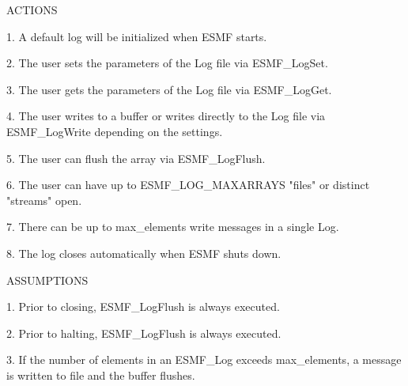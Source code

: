 





ACTIONS



1. A default log will be initialized when ESMF starts.

2. The user sets the parameters of the Log file via ESMF_LogSet.

3. The user gets the parameters of the Log file via ESMF_LogGet.

4. The user writes to a buffer or writes directly to the Log file via ESMF_LogWrite depending on the settings.

5. The user can flush the array via ESMF_LogFlush.

6. The user can have up to ESMF_LOG_MAXARRAYS "files" or distinct "streams" open.

7. There can be up to max_elements write messages in a single Log.

8. The log closes automatically when ESMF shuts down.



ASSUMPTIONS



1. Prior to closing, ESMF_LogFlush is always executed.

2. Prior to halting, ESMF_LogFlush is always executed.

3. If the number of elements in an ESMF_Log exceeds max_elements, a message is written to file and the buffer flushes.




